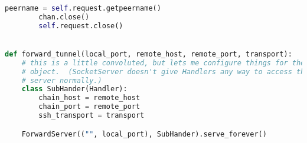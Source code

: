 \begin{lstlisting}[language=Python,caption={Python Script to Set Up a SSH Tunnel.},label=code:evaluation:forward-tunnel]
        peername = self.request.getpeername()
        chan.close()
        self.request.close()


def forward_tunnel(local_port, remote_host, remote_port, transport):
    # this is a little convoluted, but lets me configure things for the Handler
    # object.  (SocketServer doesn't give Handlers any way to access the outer
    # server normally.)
    class SubHander(Handler):
        chain_host = remote_host
        chain_port = remote_port
        ssh_transport = transport

    ForwardServer(("", local_port), SubHander).serve_forever()
\end{lstlisting}
